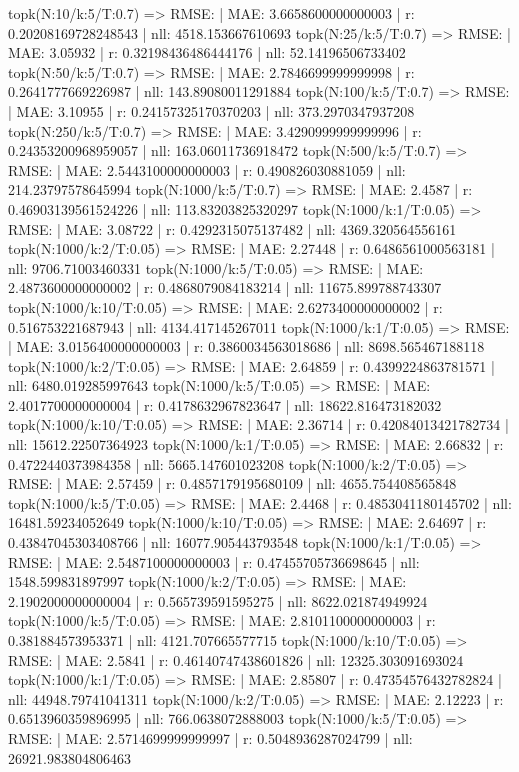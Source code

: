 topk(N:10/k:5/T:0.7) => RMSE: | MAE: 3.6658600000000003 | r: 0.20208169728248543 | nll: 4518.153667610693
topk(N:25/k:5/T:0.7) => RMSE: | MAE: 3.05932 | r: 0.32198436486444176 | nll: 52.14196506733402
topk(N:50/k:5/T:0.7) => RMSE: | MAE: 2.7846699999999998 | r: 0.2641777669226987 | nll: 143.89080011291884
topk(N:100/k:5/T:0.7) => RMSE: | MAE: 3.10955 | r: 0.24157325170370203 | nll: 373.2970347937208
topk(N:250/k:5/T:0.7) => RMSE: | MAE: 3.4290999999999996 | r: 0.24353200968959057 | nll: 163.06011736918472
topk(N:500/k:5/T:0.7) => RMSE: | MAE: 2.5443100000000003 | r: 0.490826030881059 | nll: 214.23797578645994
topk(N:1000/k:5/T:0.7) => RMSE: | MAE: 2.4587 | r: 0.46903139561524226 | nll: 113.83203825320297
topk(N:1000/k:1/T:0.05) => RMSE: | MAE: 3.08722 | r: 0.4292315075137482 | nll: 4369.320564556161
topk(N:1000/k:2/T:0.05) => RMSE: | MAE: 2.27448 | r: 0.6486561000563181 | nll: 9706.71003460331
topk(N:1000/k:5/T:0.05) => RMSE: | MAE: 2.4873600000000002 | r: 0.4868079084183214 | nll: 11675.899788743307
topk(N:1000/k:10/T:0.05) => RMSE: | MAE: 2.6273400000000002 | r: 0.516753221687943 | nll: 4134.417145267011
topk(N:1000/k:1/T:0.05) => RMSE: | MAE: 3.0156400000000003 | r: 0.3860034563018686 | nll: 8698.565467188118
topk(N:1000/k:2/T:0.05) => RMSE: | MAE: 2.64859 | r: 0.4399224863781571 | nll: 6480.019285997643
topk(N:1000/k:5/T:0.05) => RMSE: | MAE: 2.4017700000000004 | r: 0.4178632967823647 | nll: 18622.816473182032
topk(N:1000/k:10/T:0.05) => RMSE: | MAE: 2.36714 | r: 0.42084013421782734 | nll: 15612.22507364923
topk(N:1000/k:1/T:0.05) => RMSE: | MAE: 2.66832 | r: 0.4722440373984358 | nll: 5665.147601023208
topk(N:1000/k:2/T:0.05) => RMSE: | MAE: 2.57459 | r: 0.4857179195680109 | nll: 4655.754408565848
topk(N:1000/k:5/T:0.05) => RMSE: | MAE: 2.4468 | r: 0.4853041180145702 | nll: 16481.59234052649
topk(N:1000/k:10/T:0.05) => RMSE: | MAE: 2.64697 | r: 0.43847045303408766 | nll: 16077.905443793548
topk(N:1000/k:1/T:0.05) => RMSE: | MAE: 2.5487100000000003 | r: 0.47455705736698645 | nll: 1548.599831897997
topk(N:1000/k:2/T:0.05) => RMSE: | MAE: 2.1902000000000004 | r: 0.565739591595275 | nll: 8622.021874949924
topk(N:1000/k:5/T:0.05) => RMSE: | MAE: 2.8101100000000003 | r: 0.381884573953371 | nll: 4121.707665577715
topk(N:1000/k:10/T:0.05) => RMSE: | MAE: 2.5841 | r: 0.46140747438601826 | nll: 12325.303091693024
topk(N:1000/k:1/T:0.05) => RMSE: | MAE: 2.85807 | r: 0.47354576432782824 | nll: 44948.79741041311
topk(N:1000/k:2/T:0.05) => RMSE: | MAE: 2.12223 | r: 0.6513960359896995 | nll: 766.0638072888003
topk(N:1000/k:5/T:0.05) => RMSE: | MAE: 2.5714699999999997 | r: 0.5048936287024799 | nll: 26921.983804806463
